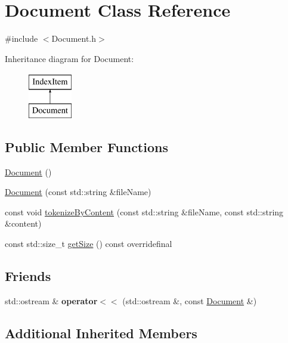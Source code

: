 \hypertarget{classDocument}{\section{Document Class Reference}
\label{classDocument}
}


{\ttfamily \#include $<$Document.\-h$>$}

Inheritance diagram for Document\-:\begin{figure}[H]
\begin{center}
\leavevmode
\includegraphics[height=2.000000cm]{classDocument}
\end{center}
\end{figure}
\subsection*{Public Member Functions}
\begin{DoxyCompactItemize}
\item 
\hyperlink{classDocument_acdbcbe550084e8c20f4f67eb229ad66a}{Document} ()
\item 
\hyperlink{classDocument_a11e577354c64a23106b0cf34c11e712f}{Document} (const std\-::string \&file\-Name)
\item 
const void \hyperlink{classDocument_a9c9a23f1b4651aff6b885c2a69bc76d2}{tokenize\-By\-Content} (const std\-::string \&file\-Name, const std\-::string \&content)
\item 
const std\-::size\-\_\-t \hyperlink{classDocument_ab93c5c78b8d8b2fb6f9a2739d4c967ca}{get\-Size} () const overridefinal
\end{DoxyCompactItemize}
\subsection*{Friends}
\begin{DoxyCompactItemize}
\item 
\hypertarget{classDocument_a801e6c851261e550881c632d31407c55}{std\-::ostream \& {\bfseries operator$<$$<$} (std\-::ostream \&, const \hyperlink{classDocument}{Document} \&)}\label{classDocument_a801e6c851261e550881c632d31407c55}

\end{DoxyCompactItemize}
\subsection*{Additional Inherited Members}


